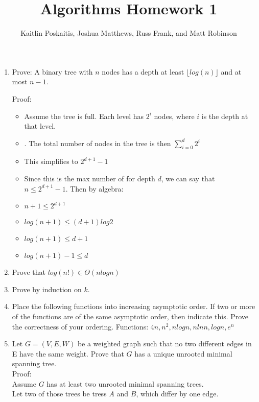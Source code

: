 \documentclass[12pt]{article}
\title{\bf Algorithms Homework 1}
\author{Kaitlin Poskaitis, Joshua Matthews, Russ Frank, and Matt Robinson}
\date{}
\begin{document}
\maketitle

\begin{enumerate}
\item Prove: A binary tree with $n$ nodes has a depth at least $\lfloor
log(n) \rfloor$ and at most $n - 1$.

Proof:

\begin{itemize}

    \item Assume the tree is full. Each level has $2^i$ nodes, where $i$ is the
        depth at that level.

    \item. The total number of nodes in the tree is then
        $\displaystyle\sum\limits_{i=0}^d 2^i$

    \item This simplifies to $2^{d+1}-1$

    \item Since this is the max number of for depth $d$, we can say that $n \leq
        2^{d+1}-1$. Then by algebra:

    \item $n+1 \leq 2^{d+1}$

    \item $log(n+1) \leq (d+1)log2$

    \item $log(n+1) \leq d+1$

    \item $log(n+1) - 1 \leq d$


\end{itemize}

\item Prove that $log(n!) \in \Theta(nlogn)$

\item Prove by induction on $k$.


\item Place the following functions into increasing asymptotic order. If two
or more of the functions are of the same asymptotic order, then indicate this.
Prove the correctness of your ordering.
Functions: $4n, n^2, nlogn, nlnn, logn, e^n$

\item Let $G = (V,E,W)$ be a weighted graph such that no two different edges
in E have the same weight. Prove that $G$ has a unique unrooted minimal spanning
tree.\\
Proof:\\
Assume $G$ has at least two unrooted minimal spanning trees.\\
Let two of those trees be tress $A$ and $B$, which differ by one
edge.


\end{enumerate}
\end{document}
